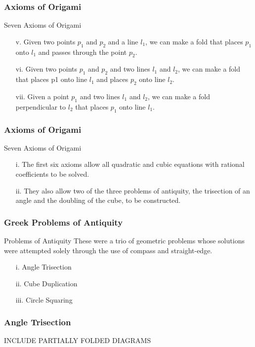 \documentclass{beamer}
\begin{document}
\begin{frame}
\frametitle{Axioms of Origami}
\begin{block}{Seven Axioms of Origami}
\begin{enumerate}
\item[v.]
Given two points $p_1$ and $p_2$ and a line $l_1$, we can make a fold that places $p_1$ onto $l_1$ and passes through the point $p_2$.
\item[vi.]
Given two points $p_1$ and $p_2$ and two lines $l_1$ and $l_2$, we can make a fold that places p1 onto line $l_1$ and places $p_2$ onto line $l_2$.
\item[vii.]
Given a point $p_1$ and two lines $l_1$ and $l_2$, we can make a fold perpendicular to $l_2$ that places $p_1$ onto line $l_1$.
\end{enumerate}
\end{block}
\end{frame}

\begin{frame}
\frametitle{Axioms of Origami}
\begin{block}{Seven Axioms of Origami}
\begin{enumerate}
\item[i.]
The first six axioms allow all quadratic and cubic equations with rational coefficients to be solved.
\item[ii.]
They also allow two of the three problems of antiquity, the trisection of an angle and the doubling of the cube, to be constructed.
\end{enumerate}
\end{block}
\end{frame}

\begin{frame}
\frametitle{Greek Problems of Antiquity}
\begin{block}{Problems of Antiquity}
These were a trio of geometric problems whose solutions were attempted solely through the use of compass and straight-edge.
\begin{enumerate}
\item[i.]
Angle Trisection
\item[ii.]
Cube Duplication
\item[iii.]
Circle Squaring
\end{enumerate}
\end{block}
\end{frame}

\begin{frame}
\frametitle{Angle Trisection}
INCLUDE PARTIALLY FOLDED DIAGRAMS
\end{frame}
\end{document}
